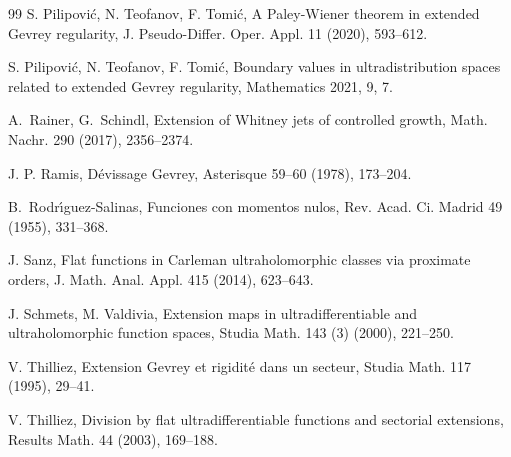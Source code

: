 \documentclass[11pt,a4paper]{article}
\theoremstyle{plain}
\theoremstyle{definition}
\begin{document}
\begin{thebibliography}{99}
 S. Pilipovi{\'c}, N. Teofanov,  F. Tomi{\'c}, A Paley-Wiener theorem in extended Gevrey regularity, J. Pseudo-Differ. Oper. Appl. 11 (2020), 593--612.

 S. Pilipovi{\'c}, N. Teofanov, F. Tomi{\'c},
Boundary values in ultradistribution spaces related to extended
Gevrey regularity, Mathematics 2021,
9, 7.

A.~Rainer, G.~Schindl,
\newblock Extension of {W}hitney jets of controlled growth,
\newblock Math. Nachr. 290 (2017), 2356--2374.

 J. P. Ramis,
D\'evissage Gevrey, Asterisque 59--60 (1978), 173--204.

 B.~Rodr{\'\i}guez-Salinas, Funciones con momentos nulos, Rev. Acad. Ci. Madrid 49 (1955), 331--368.

 J. Sanz, Flat functions in Carleman ultraholomorphic classes via proximate orders,
J. Math. Anal. Appl. 415 (2014), 623--643.

 J. Schmets, M. Valdivia, Extension maps in ultradifferentiable and ultraholomorphic function spaces, Studia Math. 143 (3) (2000), 221--250.

 V. Thilliez,
Extension Gevrey et rigidit\'e dans un secteur, Studia Math.
 117 (1995), 29--41.

 V. Thilliez, Division by flat ultradifferentiable functions and sectorial extensions, Results Math. 44 (2003), 169--188.

\end{thebibliography}


%
%
%
\end{document}
